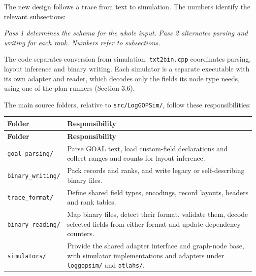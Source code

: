 \documentclass[10pt,a4paper]{article}
\begin{document}
The new design follows a trace from text to simulation. The numbers identify the relevant subsections:

\begin{center}
\resizebox{\linewidth}{!}{}
\par\nopagebreak\small\itshape Pass 1 determines the schema for the whole input. Pass 2 alternates parsing and writing for each rank. Numbers refer to subsections.
\end{center}

The code separates conversion from simulation: \texttt{txt2bin.\allowbreak{}cpp} coordinates parsing, layout inference and binary writing. Each simulator is a separate executable with its own adapter and reader, which decodes only the fields its node type needs, using one of the plan runners (Section 3.6).

The main source folders, relative to \texttt{src/\allowbreak{}LogGOPSim/\allowbreak{}}, follow these responsibilities:

{\small
\begin{longtable}{P{0.28\dimexpr{}\tabcolsep\relax}P{0.72\dimexpr{}\tabcolsep\relax}}
\toprule
\textbf{Folder} & \textbf{Responsibility} \\
\midrule
\endfirsthead
\toprule
\textbf{Folder} & \textbf{Responsibility} \\
\midrule
\endhead
\bottomrule
\endfoot
\texttt{goal\_\allowbreak{}parsing/\allowbreak{}} & Parse GOAL text, load custom-field declarations and collect ranges and counts for layout inference. \\
\texttt{binary\_\allowbreak{}writing/\allowbreak{}} & Pack records and ranks, and write legacy or self-describing binary files. \\
\texttt{trace\_\allowbreak{}format/\allowbreak{}} & Define shared field types, encodings, record layouts, headers and rank tables. \\
\texttt{binary\_\allowbreak{}reading/\allowbreak{}} & Map binary files, detect their format, validate them, decode selected fields from either format and update dependency counters. \\
\texttt{simulators/\allowbreak{}} & Provide the shared adapter interface and graph-node base, with simulator implementations and adapters under \texttt{loggopsim/\allowbreak{}} and \texttt{atlahs/\allowbreak{}}. \\
\end{longtable}
}

\hypertarget{required-fields}{}
\end{document}
